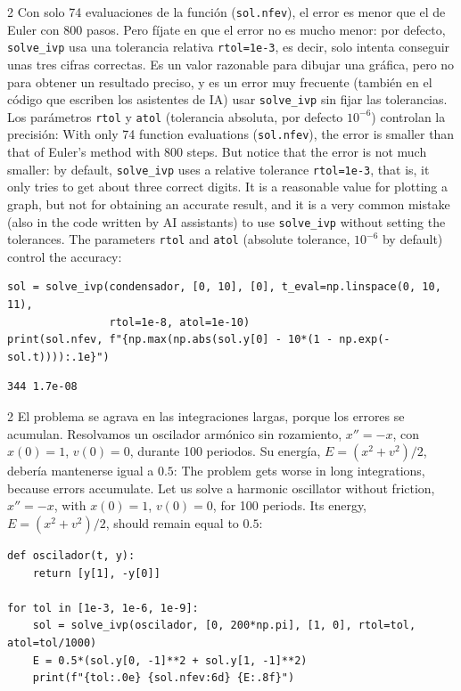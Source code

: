 \begin{paracol}{2}
Con solo 74 evaluaciones de la función (\texttt{sol.nfev}), el error es menor que el de Euler con 800 pasos. Pero fíjate en que el error no es mucho menor: por defecto, \texttt{solve_ivp} usa una tolerancia relativa \texttt{rtol=1e-3}, es decir, solo intenta conseguir unas tres cifras correctas. Es un valor razonable para dibujar una gráfica, pero no para obtener un resultado preciso, y es un error muy frecuente (también en el código que escriben los asistentes de IA) usar \texttt{solve_ivp} sin fijar las tolerancias. Los parámetros \texttt{rtol} y \texttt{atol} (tolerancia absoluta, por defecto $10^{-6}$) controlan la precisión:
\switchcolumn
With only 74 function evaluations (\texttt{sol.nfev}), the error is smaller than that of Euler's method with 800 steps. But notice that the error is not much smaller: by default, \texttt{solve_ivp} uses a relative tolerance \texttt{rtol=1e-3}, that is, it only tries to get about three correct digits. It is a reasonable value for plotting a graph, but not for obtaining an accurate result, and it is a very common mistake (also in the code written by AI assistants) to use \texttt{solve_ivp} without setting the tolerances. The parameters \texttt{rtol} and \texttt{atol} (absolute tolerance, $10^{-6}$ by default) control the accuracy:
\end{paracol}
\begin{verbatim}
sol = solve_ivp(condensador, [0, 10], [0], t_eval=np.linspace(0, 10, 11),
                rtol=1e-8, atol=1e-10)
print(sol.nfev, f"{np.max(np.abs(sol.y[0] - 10*(1 - np.exp(-sol.t)))):.1e}")
\end{verbatim}
\begin{verbatim}
344 1.7e-08
\end{verbatim}
\begin{paracol}{2}
El problema se agrava en las integraciones largas, porque los errores se acumulan. Resolvamos un oscilador armónico sin rozamiento, $x''=-x$, con $x(0)=1$, $v(0)=0$, durante 100 periodos. Su energía, $E=(x^2+v^2)/2$, debería mantenerse igual a $0.5$:
\switchcolumn
The problem gets worse in long integrations, because errors accumulate. Let us solve a harmonic oscillator without friction, $x''=-x$, with $x(0)=1$, $v(0)=0$, for 100 periods. Its energy, $E=(x^2+v^2)/2$, should remain equal to $0.5$:
\end{paracol}
\begin{verbatim}
def oscilador(t, y):
    return [y[1], -y[0]]

for tol in [1e-3, 1e-6, 1e-9]:
    sol = solve_ivp(oscilador, [0, 200*np.pi], [1, 0], rtol=tol, atol=tol/1000)
    E = 0.5*(sol.y[0, -1]**2 + sol.y[1, -1]**2)
    print(f"{tol:.0e} {sol.nfev:6d} {E:.8f}")
\end{verbatim}
